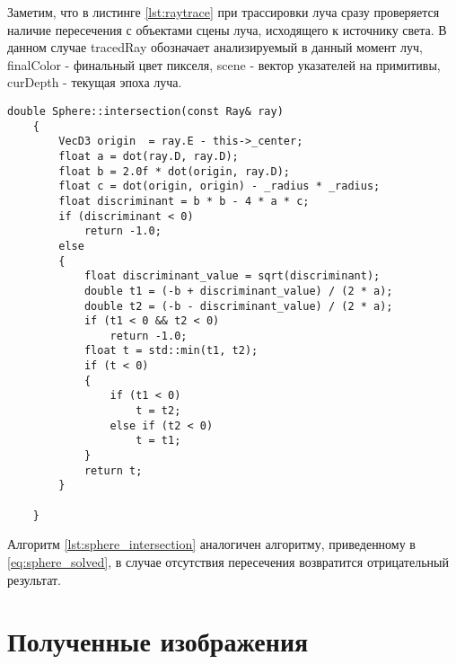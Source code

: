Заметим, что в листинге \ref{lst:raytrace} при трассировки луча сразу проверяется наличие пересечения с объектами сцены луча, исходящего к источнику света.
В данном случае tracedRay обозначает анализируемый в данный момент луч, finalColor - финальный цвет пикселя, scene - вектор указателей на примитивы, curDepth - текущая эпоха луча.


\begin{lstlisting}[label = lst:sphere_intersection,caption= {Алгоритм поиска пересечения со сферой}]
    double Sphere::intersection(const Ray& ray)
    {
        VecD3 origin  = ray.E - this->_center;
        float a = dot(ray.D, ray.D);
        float b = 2.0f * dot(origin, ray.D);
        float c = dot(origin, origin) - _radius * _radius;
        float discriminant = b * b - 4 * a * c;
        if (discriminant < 0)
            return -1.0; 
        else
        {
            float discriminant_value = sqrt(discriminant);
            double t1 = (-b + discriminant_value) / (2 * a);
            double t2 = (-b - discriminant_value) / (2 * a);
            if (t1 < 0 && t2 < 0)
                return -1.0;
            float t = std::min(t1, t2);
            if (t < 0)
            {
                if (t1 < 0)
                    t = t2;
                else if (t2 < 0)
                    t = t1;
            }
            return t;
        }
    
    }
\end{lstlisting}

Алгоритм \ref{lst:sphere_intersection} аналогичен алгоритму, приведенному в \ref{eq:sphere_solved}, в случае отсутствия пересечения возвратится отрицательный
результат.
\section{Полученные изображения}